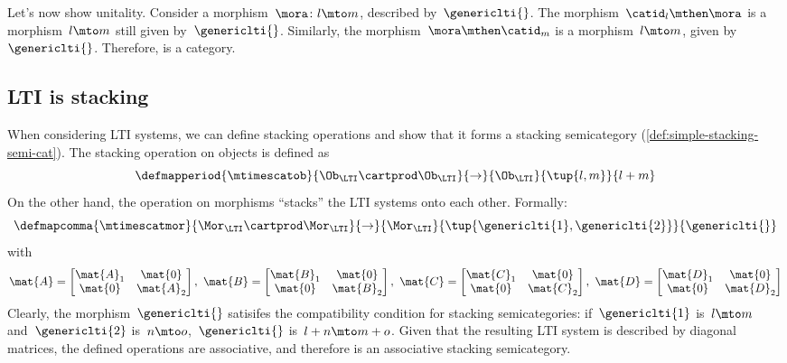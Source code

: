 \begin{solution}
    Let's now show unitality.
    Consider a morphism~$\mora\colon l\mto m$, described by~$\genericlti{}$.
    The morphism~$\catid_l \mthen \mora$ is a morphism~$l\mto m$ still given by~$\genericlti{}$.
    Similarly, the morphism~$\mora\mthen \catid_m$ is a morphism~$l\mto m$, given by~$\genericlti{}$.
    Therefore, \LTI is a category.
\end{solution}

\subsection{LTI is stacking}
When considering LTI systems, we can define stacking operations and show that it forms a stacking semicategory (\cref{def:simple-stacking-semi-cat}).
The stacking operation on objects is defined as
\begin{equation*}
    \defmapperiod{\mtimescatob}{\Ob_\LTI \cartprod \Ob_\LTI}{\to}{\Ob_\LTI}{\tup{l,m}}{l+m}
\end{equation*}
On the other hand, the operation on morphisms ``stacks'' the LTI systems onto each other.
Formally:
\begin{equation*}
    \defmapcomma{\mtimescatmor}{\Mor_\LTI \cartprod \Mor_\LTI}{\to}{\Mor_\LTI}{\tup{\genericlti{1},\genericlti{2}}}{\genericlti{}}
\end{equation*}
with
\begin{equation*}
    \mat{A}=\begin{bmatrix}
        \mat{A}_1 & \mat{0}   \\
        \mat{0}   & \mat{A}_2
    \end{bmatrix}, \
    \mat{B}=\begin{bmatrix}
        \mat{B}_1 & \mat{0}   \\
        \mat{0}   & \mat{B}_2
    \end{bmatrix},\
    \mat{C}=\begin{bmatrix}
        \mat{C}_1 & \mat{0}   \\
        \mat{0}   & \mat{C}_2
    \end{bmatrix},\
    \mat{D}=\begin{bmatrix}
        \mat{D}_1 & \mat{0}   \\
        \mat{0}   & \mat{D}_2
    \end{bmatrix}
\end{equation*}
Clearly, the morphism~$\genericlti{}$ satisifes the compatibility condition for stacking semicategories: if~$\genericlti{1}$ is~$l\mto m$ and~$\genericlti{2}$ is~$n\mto o$,~$\genericlti{}$ is~$l+n\mto m+o$.
Given that the resulting LTI system is described by diagonal matrices, the defined operations are associative, and therefore \LTI is an associative stacking semicategory.

